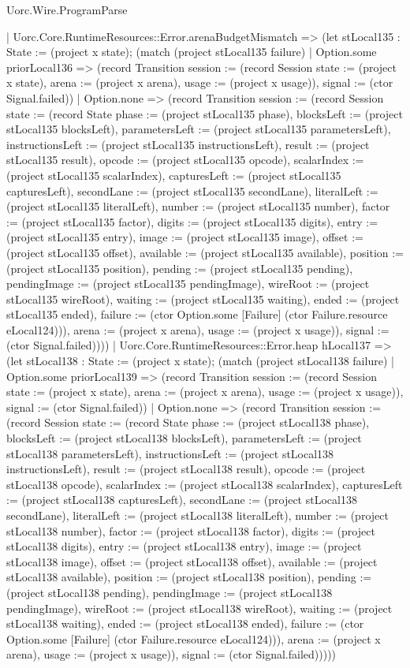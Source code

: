 \begin{lexlean}{Uorc.Wire.ProgramParse}
\begin{semanticmodule}
{      | Uorc.Core.RuntimeResources::Error.arenaBudgetMismatch => (let stLocal135 : State := (project x state); (match (project stLocal135 failure)
        | Option.some priorLocal136 => (record Transition {session := (record Session {state := (project x state), arena := (project x arena), usage := (project x usage)}), signal := (ctor Signal.failed)})
        | Option.none => (record Transition {session := (record Session {state := (record State {phase := (project stLocal135 phase), blocksLeft := (project stLocal135 blocksLeft), parametersLeft := (project stLocal135 parametersLeft), instructionsLeft := (project stLocal135 instructionsLeft), result := (project stLocal135 result), opcode := (project stLocal135 opcode), scalarIndex := (project stLocal135 scalarIndex), capturesLeft := (project stLocal135 capturesLeft), secondLane := (project stLocal135 secondLane), literalLeft := (project stLocal135 literalLeft), number := (project stLocal135 number), factor := (project stLocal135 factor), digits := (project stLocal135 digits), entry := (project stLocal135 entry), image := (project stLocal135 image), offset := (project stLocal135 offset), available := (project stLocal135 available), position := (project stLocal135 position), pending := (project stLocal135 pending), pendingImage := (project stLocal135 pendingImage), wireRoot := (project stLocal135 wireRoot), waiting := (project stLocal135 waiting), ended := (project stLocal135 ended), failure := (ctor Option.some [Failure] (ctor Failure.resource eLocal124))}), arena := (project x arena), usage := (project x usage)}), signal := (ctor Signal.failed)})))
      | Uorc.Core.RuntimeResources::Error.heap hLocal137 => (let stLocal138 : State := (project x state); (match (project stLocal138 failure)
        | Option.some priorLocal139 => (record Transition {session := (record Session {state := (project x state), arena := (project x arena), usage := (project x usage)}), signal := (ctor Signal.failed)})
        | Option.none => (record Transition {session := (record Session {state := (record State {phase := (project stLocal138 phase), blocksLeft := (project stLocal138 blocksLeft), parametersLeft := (project stLocal138 parametersLeft), instructionsLeft := (project stLocal138 instructionsLeft), result := (project stLocal138 result), opcode := (project stLocal138 opcode), scalarIndex := (project stLocal138 scalarIndex), capturesLeft := (project stLocal138 capturesLeft), secondLane := (project stLocal138 secondLane), literalLeft := (project stLocal138 literalLeft), number := (project stLocal138 number), factor := (project stLocal138 factor), digits := (project stLocal138 digits), entry := (project stLocal138 entry), image := (project stLocal138 image), offset := (project stLocal138 offset), available := (project stLocal138 available), position := (project stLocal138 position), pending := (project stLocal138 pending), pendingImage := (project stLocal138 pendingImage), wireRoot := (project stLocal138 wireRoot), waiting := (project stLocal138 waiting), ended := (project stLocal138 ended), failure := (ctor Option.some [Failure] (ctor Failure.resource eLocal124))}), arena := (project x arena), usage := (project x usage)}), signal := (ctor Signal.failed)}))))
}
\end{semanticmodule}
\end{lexlean}
